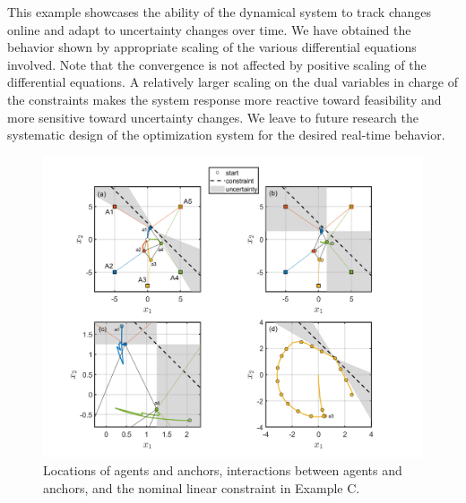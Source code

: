 \documentclass[journal,twoside,web]{ieeecolor}
\begin{document}
This example showcases the ability of the dynamical system to track changes online and adapt to uncertainty changes over time. We have obtained the behavior shown by appropriate scaling of the various differential equations involved. Note that the convergence is not affected by positive scaling of the differential equations. A relatively larger scaling on the dual variables in charge of the constraints makes the system response more reactive toward feasibility and more sensitive toward uncertainty changes. We leave to future research the systematic design of the optimization system for the desired real-time behavior.

\begin{figure}
\begin{center}
\includegraphics[scale=0.26]{simulation_figure_finalv3.png}
\vspace{-1.5mm}
\caption{Locations of agents and anchors, interactions between agents and anchors, and the nominal linear constraint in Example C.}
\label{fig_points}
\end{center}
\end{figure}

\end{document}

